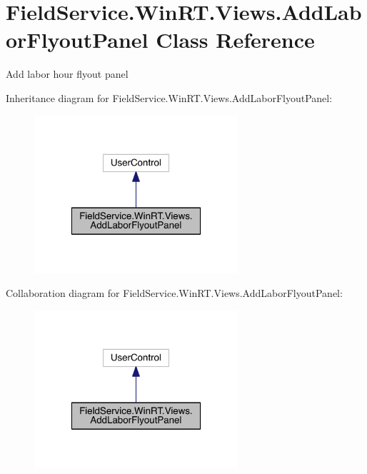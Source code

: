 \hypertarget{class_field_service_1_1_win_r_t_1_1_views_1_1_add_labor_flyout_panel}{\section{Field\+Service.\+Win\+R\+T.\+Views.\+Add\+Labor\+Flyout\+Panel Class Reference}
\label{class_field_service_1_1_win_r_t_1_1_views_1_1_add_labor_flyout_panel}
}


Add labor hour flyout panel  




Inheritance diagram for Field\+Service.\+Win\+R\+T.\+Views.\+Add\+Labor\+Flyout\+Panel\+:
\nopagebreak
\begin{figure}[H]
\begin{center}
\leavevmode
\includegraphics[width=214pt]{class_field_service_1_1_win_r_t_1_1_views_1_1_add_labor_flyout_panel__inherit__graph}
\end{center}
\end{figure}


Collaboration diagram for Field\+Service.\+Win\+R\+T.\+Views.\+Add\+Labor\+Flyout\+Panel\+:
\nopagebreak
\begin{figure}[H]
\begin{center}
\leavevmode
\includegraphics[width=214pt]{class_field_service_1_1_win_r_t_1_1_views_1_1_add_labor_flyout_panel__coll__graph}
\end{center}
\end{figure}
